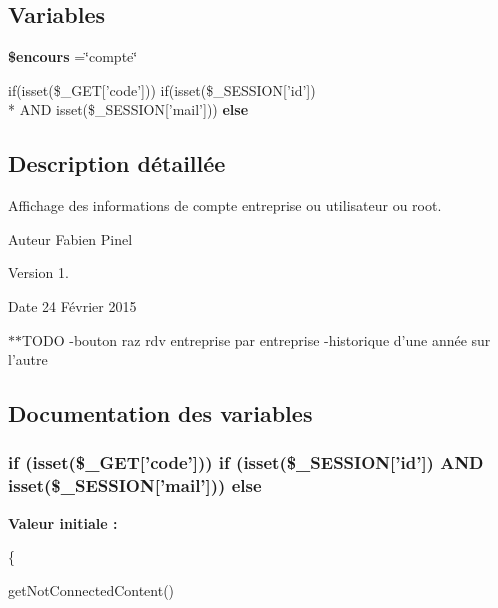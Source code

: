 \subsection*{Variables}
\begin{DoxyCompactItemize}
\item 
\hypertarget{compte_8php_af7b0e56292699e6983c24fbbf70ce08d}{{\bfseries \$encours} =\char`\"{}compte\char`\"{}}\label{compte_8php_af7b0e56292699e6983c24fbbf70ce08d}

\item 
if(isset(\$\-\_\-\-G\-E\-T\mbox{[}'code'\mbox{]})) if(isset(\$\-\_\-\-S\-E\-S\-S\-I\-O\-N\mbox{[}'id'\mbox{]}) \\*
A\-N\-D isset(\$\-\_\-\-S\-E\-S\-S\-I\-O\-N\mbox{[}'mail'\mbox{]})) {\bfseries else}
\end{DoxyCompactItemize}


\subsection{Description détaillée}
Affichage des informations de compte entreprise ou utilisateur ou root. \begin{DoxyAuthor}{Auteur}
Fabien Pinel 
\end{DoxyAuthor}
\begin{DoxyVersion}{Version}
1. 
\end{DoxyVersion}
\begin{DoxyDate}{Date}
24 Février 2015
\end{DoxyDate}
$\ast$$\ast$\-T\-O\-D\-O -\/bouton raz rdv entreprise par entreprise -\/historique d'une année sur l'autre 

\subsection{Documentation des variables}
\hypertarget{compte_8php_ab7c6f74ade7b2cd00198262b9bae01a9}{
\subsubsection[{else}]{\setlength{\rightskip}{0pt plus 5cm}if (isset(\$\-\_\-\-G\-E\-T\mbox{[}'code'\mbox{]})) if (isset(\$\-\_\-\-S\-E\-S\-S\-I\-O\-N\mbox{[}'id'\mbox{]}) A\-N\-D isset(\$\-\_\-\-S\-E\-S\-S\-I\-O\-N\mbox{[}'mail'\mbox{]})) else}}\label{compte_8php_ab7c6f74ade7b2cd00198262b9bae01a9}
{\bfseries Valeur initiale \-:}
\begin{DoxyCode}
\{   
        
        getNotConnectedContent()
\end{DoxyCode}
